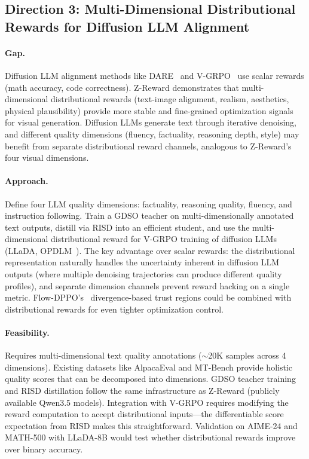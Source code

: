 \documentclass[11pt,a4paper]{article}
\begin{document}
\subsection{Direction 3: Multi-Dimensional Distributional Rewards for Diffusion LLM Alignment}

\paragraph{Gap.} Diffusion LLM alignment methods like DARE~\cite{xu2026dare} and V-GRPO~\cite{li2026vgrpo} use scalar rewards (math accuracy, code correctness). Z-Reward demonstrates that multi-dimensional distributional rewards (text-image alignment, realism, aesthetics, physical plausibility) provide more stable and fine-grained optimization signals for visual generation. Diffusion LLMs generate text through iterative denoising, and different quality dimensions (fluency, factuality, reasoning depth, style) may benefit from separate distributional reward channels, analogous to Z-Reward's four visual dimensions.

\paragraph{Approach.} Define four LLM quality dimensions: factuality, reasoning quality, fluency, and instruction following. Train a GDSO teacher on multi-dimensionally annotated text outputs, distill via RISD into an efficient student, and use the multi-dimensional distributional reward for V-GRPO training of diffusion LLMs (LLaDA, OPDLM~\cite{su2026opdlm}). The key advantage over scalar rewards: the distributional representation naturally handles the uncertainty inherent in diffusion LLM outputs (where multiple denoising trajectories can produce different quality profiles), and separate dimension channels prevent reward hacking on a single metric. Flow-DPPO's~\cite{ping2026flowdppo} divergence-based trust regions could be combined with distributional rewards for even tighter optimization control.

\paragraph{Feasibility.} Requires multi-dimensional text quality annotations ($\sim$20K samples across 4 dimensions). Existing datasets like AlpacaEval and MT-Bench provide holistic quality scores that can be decomposed into dimensions. GDSO teacher training and RISD distillation follow the same infrastructure as Z-Reward (publicly available Qwen3.5 models). Integration with V-GRPO requires modifying the reward computation to accept distributional inputs---the differentiable score expectation from RISD makes this straightforward. Validation on AIME-24 and MATH-500 with LLaDA-8B would test whether distributional rewards improve over binary accuracy.
\end{document}
